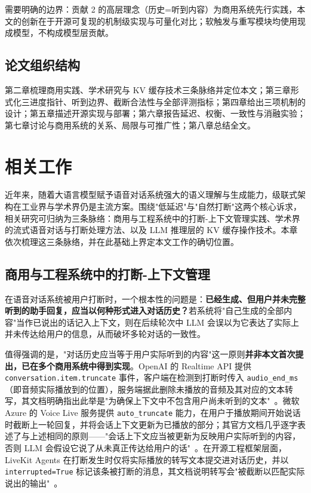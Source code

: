 \documentclass[conference]{IEEEtran}
\theoremstyle{definition}
\begin{document}
需要明确的边界：贡献 2 的高层理念（历史=听到内容）为商用系统先行实践，本文的创新在于开源可复现的机制级实现与可量化对比；软触发与重写模块均使用现成模型，不构成模型层贡献。

\subsection{论文组织结构}
第二章梳理商用实践、学术研究与 KV 缓存技术三条脉络并定位本文；第三章形式化三进度指针、听到边界、截断合法性与全部评测指标；第四章给出三项机制的设计；第五章描述开源实现与部署；第六章报告延迟、权衡、一致性与消融实验；第七章讨论与商用系统的关系、局限与可推广性；第八章总结全文。

\section{相关工作}
近年来，随着大语言模型赋予语音对话系统强大的语义理解与生成能力，级联式架构在工业界与学术界仍是主流方案。围绕"低延迟"与"自然打断"这两个核心诉求，相关研究可归纳为三条脉络：商用与工程系统中的打断-上下文管理实践、学术界的流式语音对话与打断处理方法、以及 LLM 推理层的 KV 缓存操作技术。本章依次梳理这三条脉络，并在此基础上界定本文工作的确切位置。

\subsection{商用与工程系统中的打断-上下文管理}
在语音对话系统被用户打断时，一个根本性的问题是：\textbf{已经生成、但用户并未完整听到的助手回复，应当以何种形式进入对话历史？}若系统将"自己生成的全部内容"当作已说出的话记入上下文，则在后续轮次中 LLM 会误以为它表达了实际上并未传达给用户的信息，从而破坏多轮对话的一致性。

值得强调的是，"对话历史应当等于用户实际听到的内容"这一原则\textbf{并非本文首次提出，已在多个商用系统中得到实现}。OpenAI 的 Realtime API 提供 \texttt{conversation.item.truncate} 事件，客户端在检测到打断时传入 \texttt{audio\_end\_ms}（即音频实际播放到的位置），服务端据此删除未播放的音频及其对应的文本转写，其文档明确指出此举是"为确保上下文中不包含用户尚未听到的文本"~\cite{openai_realtime}。微软 Azure 的 Voice Live 服务提供 \texttt{auto\_truncate} 能力，在用户于播放期间开始说话时截断上一轮回复，并将会话上下文更新为已播放的部分；其官方文档几乎逐字表述了与上述相同的原则——"会话上下文应当被更新为反映用户实际听到的内容，否则 LLM 会假设它说了从未真正传达给用户的话"~\cite{azure_voicelive}。在开源工程框架层面，LiveKit Agents 在打断发生时仅将实际播放的转写文本提交进对话历史，并以 \texttt{interrupted=True} 标记该条被打断的消息，其文档说明转写会"被截断以匹配实际说出的输出"~\cite{livekit_agents}。
\end{document}

